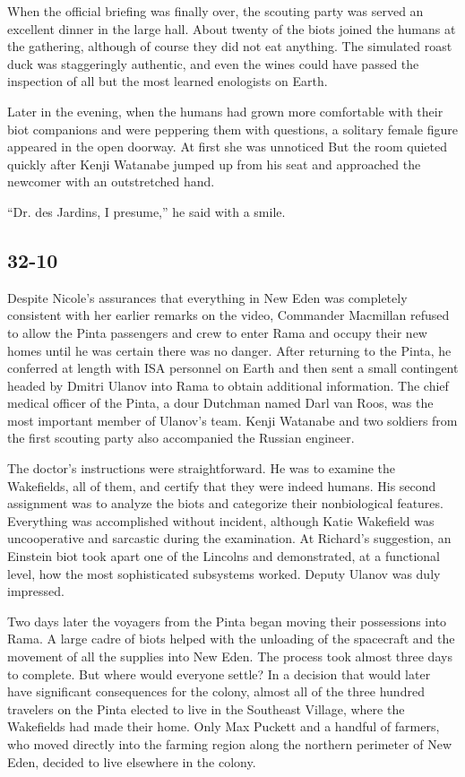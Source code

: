 \documentclass[]{article}
\begin{document}
{When the official briefing was finally over, the scouting party was served an excellent dinner in the large hall. About twenty of the biots joined the humans at the gathering, although of course they did not eat anything. The simulated roast duck was staggeringly authentic, and even the wines could have passed the inspection of all but the most learned enologists on Earth.

Later in the evening, when the humans had grown more comfortable with their biot companions and were peppering them with questions, a solitary female figure appeared in the open doorway. At first she was unnoticed But the room quieted quickly after Kenji Watanabe jumped up from his seat and approached the newcomer with an outstretched hand.

“Dr. des Jardins, I presume,” he said with a smile.


\subsection{32-10}

Despite Nicole’s assurances that everything in New Eden was completely consistent with her earlier remarks on the video, Commander Macmillan refused to allow the Pinta passengers and crew to enter Rama and occupy their new homes until he was certain there was no danger. After returning to the Pinta, he conferred at length with ISA personnel on Earth and then sent a small contingent headed by Dmitri Ulanov into Rama to obtain additional information. The chief medical officer of the Pinta, a dour Dutchman named Darl van Roos, was the most important member of Ulanov’s team. Kenji Watanabe and two soldiers from the first scouting party also accompanied the Russian engineer.

The doctor’s instructions were straightforward. He was to examine the Wakefields, all of them, and certify that they were indeed humans. His second assignment was to analyze the biots and categorize their nonbiological features. Everything was accomplished without incident, although Katie Wakefield was uncooperative and sarcastic during the examination. At Richard’s suggestion, an Einstein biot took apart one of the Lincolns and demonstrated, at a functional level, how the most sophisticated subsystems worked. Deputy Ulanov was duly impressed.

Two days later the voyagers from the Pinta began moving their possessions into Rama. A large cadre of biots helped with the unloading of the spacecraft and the movement of all the supplies into New Eden. The process took almost three days to complete. But where would everyone settle? In a decision that would later have significant consequences for the colony, almost all of the three hundred travelers on the Pinta elected to live in the Southeast Village, where the Wakefields had made their home. Only Max Puckett and a handful of farmers, who moved directly into the farming region along the northern perimeter of New Eden, decided to live elsewhere in the colony.

}
\end{document}
